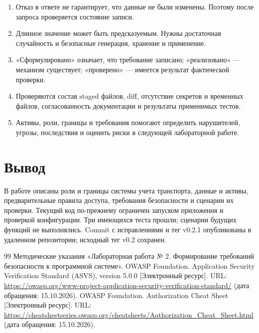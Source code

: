 \documentclass[12pt,a4paper]{article}
\begin{document}
\begin{enumerate}
\item Отказ в ответе не гарантирует, что данные не были изменены. Поэтому после запроса проверяется состояние записи.
\item Длинное значение может быть предсказуемым. Нужны достаточная случайность и безопасные генерация, хранение и применение.
\item «Сформулировано» означает, что требование записано; «реализовано» — механизм существует; «проверено» — имеется результат фактической проверки.
\item Проверяются состав staged файлов, diff, отсутствие секретов и временных файлов, согласованность документации и результаты применимых тестов.
\item Активы, роли, границы и требования помогают определить нарушителей, угрозы, последствия и оценить риски в следующей лабораторной работе.
\end{enumerate}

\section{Вывод}
В работе описаны роли и границы системы учета транспорта, данные и активы, предварительные правила доступа, требования безопасности и сценарии их проверки. Текущий код по-прежнему ограничен запуском приложения и проверкой конфигурации. Три имеющихся теста прошли; сценарии будущих функций не выполнялись. Commit с исправлениями и тег v0.2.1 опубликованы в удаленном репозитории; исходный тег v0.2 сохранен.

\clearpage
\renewcommand{\refname}{Список использованных источников}
\begin{thebibliography}{99}
 Методические указания «Лабораторная работа № 2. Формирование требований безопасности к программной системе».
 \mbox{OWASP} Foundation. Application Security Verification Standard (ASVS), version 5.0.0 [Электронный ресурс]. URL: \url{https://owasp.org/www-project-application-security-verification-standard/} (дата обращения: 15.10.2026).
 \mbox{OWASP} Foundation. Authorization Cheat Sheet [Электронный ресурс]. URL: \url{https://cheatsheetseries.owasp.org/cheatsheets/Authorization_Cheat_Sheet.html} (дата обращения: 15.10.2026).
\end{thebibliography}
\end{document}
